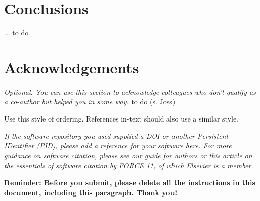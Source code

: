 \documentclass[preprint,12pt, a4paper]{elsarticle}
\begin{document}
\section{Conclusions}
... to do

\section*{Acknowledgements}
\label{}
\textit{Optional. You can use this section to acknowledge colleagues who don’t qualify as a co-author but helped you in some way. }
to do (s. Joss)





 

\begin{thebibliography}{00}


\bibitem{} Use this style of ordering. References in-text should also use a similar style.

\end{thebibliography}

\textit{If the software repository you used supplied a DOI or another
Persistent IDentifier (PID), please add a reference for your software
here. For more guidance on software citation, please see our guide for
authors or \href{https://f1000research.com/articles/9-1257/v2}{this
  article on the essentials of software citation by FORCE 11}, of
which Elsevier is a member.}

\large{\textbf{Reminder: Before you submit, please delete all 
the instructions in this document, 
including this paragraph. 
Thank you!}}
\end{document}
